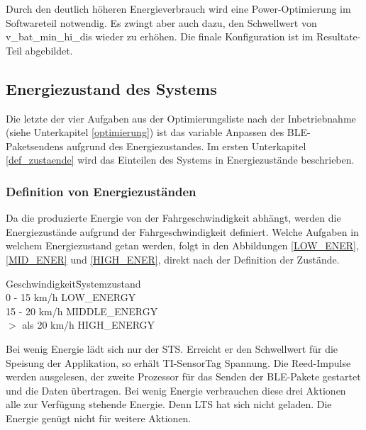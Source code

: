 
Durch den deutlich höheren Energieverbrauch wird eine Power-Optimierung im Softwareteil notwendig. Es zwingt aber auch dazu, den Schwellwert von v\_bat\_min\_hi\_dis  wieder zu erhöhen. Die finale Konfiguration ist im Resultate-Teil abgebildet.


\subsection{Energiezustand des Systems}
\label{v_energiezustand}

Die letzte der vier Aufgaben aus der Optimierungsliste nach der Inbetriebnahme (siehe Unterkapitel \ref{optimierung}) ist das variable Anpassen des BLE-Paketsendens aufgrund des Energiezustandes. Im ersten Unterkapitel \ref{def_zustaende} wird das Einteilen des Systems in Energiezustände beschrieben. %


\subsubsection*{Definition von Energiezuständen}
\label{def_zustaende} 

Da die produzierte Energie von der Fahrgeschwindigkeit abhängt, werden die Energiezustände aufgrund der Fahrgeschwindigkeit definiert. Welche Aufgaben in welchem Energiezustand getan werden, folgt in den Abbildungen \ref{LOW_ENER}, \ref{MID_ENER} und \ref{HIGH_ENER}, direkt nach der Definition der Zustände. 

\begin{minipage}{\textwidth}
    \begin{tabbing}
       Geschwindigkeit\quad\= Systemzustand\\[0.8ex]
       0 - 15 km/h        \> LOW\_ENERGY\\
       15 - 20 km/h       \> MIDDLE\_ENERGY\\
       $>$ als 20 km/h    \> HIGH\_ENERGY\\    
    \end{tabbing}
\end{minipage}

Bei wenig Energie lädt sich nur der STS. Erreicht er den Schwellwert für die Speisung der Applikation, so erhält TI-SensorTag Spannung. Die Reed-Impulse werden ausgelesen, der zweite Prozessor für das Senden der BLE-Pakete gestartet und die Daten übertragen. Bei wenig Energie verbrauchen diese drei Aktionen alle zur Verfügung stehende Energie. Denn LTS hat sich nicht geladen. Die Energie genügt nicht für weitere Aktionen.

